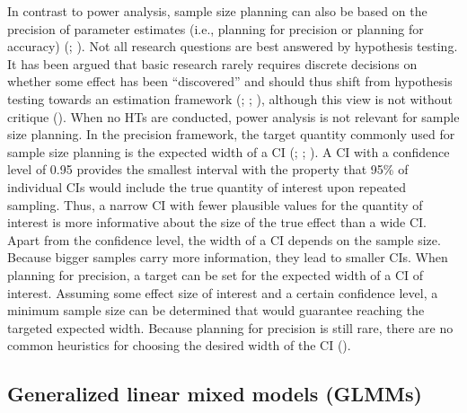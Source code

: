 \documentclass[
  man,
  floatsintext,
  longtable,
  a4paper,
  nolmodern,
  notxfonts,
  notimes,
  colorlinks=true,linkcolor=blue,citecolor=blue,urlcolor=blue]{apa7}
\begin{document}
In contrast to power analysis, sample size planning can also be based on
the precision of parameter estimates (i.e., planning for precision or
planning for accuracy)
(;
). Not
all research questions are best answered by hypothesis testing. It has
been argued that basic research rarely requires discrete decisions on
whether some effect has been ``discovered'' and should thus shift from
hypothesis testing towards an estimation framework
(;
;
), although this view is not without critique
(). When no HTs are conducted, power analysis is not relevant
for sample size planning. In the precision framework, the target
quantity commonly used for sample size planning is the expected width of
a CI (; ;
). A
CI with a confidence level of 0.95 provides the smallest interval with
the property that 95\% of individual CIs would include the true quantity
of interest upon repeated sampling. Thus, a narrow CI with fewer
plausible values for the quantity of interest is more informative about
the size of the true effect than a wide CI. Apart from the confidence
level, the width of a CI depends on the sample size. Because bigger
samples carry more information, they lead to smaller CIs. When planning
for precision, a target can be set for the expected width of a CI of
interest. Assuming some effect size of interest and a certain confidence
level, a minimum sample size can be determined that would guarantee
reaching the targeted expected width. Because planning for precision is
still rare, there are no common heuristics for choosing the desired
width of the CI
().

\subsection{Generalized linear mixed models
(GLMMs)}\label{generalized-linear-mixed-models-glmms}
\end{document}
